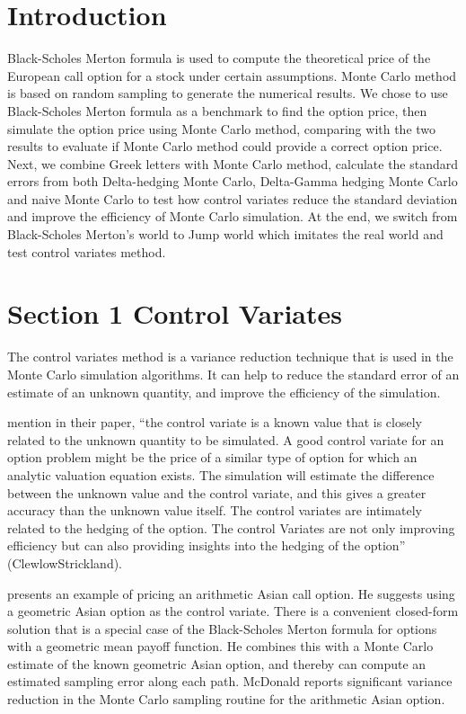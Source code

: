 \documentclass[11pt,]{article}
\begin{document}
\vskip 6.5pt

\noindent \doublespacing \section{Introduction}\label{introduction}

Black-Scholes Merton formula is used to compute the theoretical price of
the European call option for a stock under certain assumptions. Monte
Carlo method is based on random sampling to generate the numerical
results. We chose to use Black-Scholes Merton formula as a benchmark to
find the option price, then simulate the option price using Monte Carlo
method, comparing with the two results to evaluate if Monte Carlo method
could provide a correct option price. Next, we combine Greek letters
with Monte Carlo method, calculate the standard errors from both
Delta-hedging Monte Carlo, Delta-Gamma hedging Monte Carlo and naive
Monte Carlo to test how control variates reduce the standard deviation
and improve the efficiency of Monte Carlo simulation. At the end, we
switch from Black-Scholes Merton's world to Jump world which imitates
the real world and test control variates method.

\section{Section 1 Control Variates}\label{section-1-control-variates}

The control variates method is a variance reduction technique that is
used in the Monte Carlo simulation algorithms. It can help to reduce the
standard error of an estimate of an unknown quantity, and improve the
efficiency of the simulation.

\citet{ClewlowandCarverhill} mention in their paper, ``the control
variate is a known value that is closely related to the unknown quantity
to be simulated. A good control variate for an option problem might be
the price of a similar type of option for which an analytic valuation
equation exists. The simulation will estimate the difference between the
unknown value and the control variate, and this gives a greater accuracy
than the unknown value itself. The control variates are intimately
related to the hedging of the option. The control Variates are not only
improving efficiency but can also providing insights into the hedging of
the option'' (ClewlowStrickland).

\citet{McDonald} presents an example of pricing an arithmetic Asian call
option. He suggests using a geometric Asian option as the control
variate. There is a convenient closed-form solution that is a special
case of the Black-Scholes Merton formula for options with a geometric
mean payoff function. He combines this with a Monte Carlo estimate of
the known geometric Asian option, and thereby can compute an estimated
sampling error along each path. McDonald reports significant variance
reduction in the Monte Carlo sampling routine for the arithmetic Asian
option.
\end{document}
